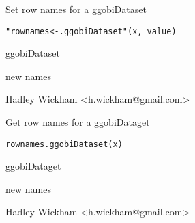 \documentclass{article}
\begin{document}
\begin{Description}\relax
Set row names for a ggobiDataset
\end{Description}
\begin{Usage}
\begin{verbatim}"rownames<-.ggobiDataset"(x, value)\end{verbatim}
\end{Usage}
\begin{Arguments}
\begin{ldescription}
\item[\code{x}] ggobiDataset
\item[\code{value}] new names
\end{ldescription}
\end{Arguments}
\begin{Details}\relax
\end{Details}
\begin{Author}\relax
Hadley Wickham <h.wickham@gmail.com>
\end{Author}
\begin{Examples}
\begin{ExampleCode}\end{ExampleCode}
\end{Examples}

\begin{Description}\relax
Get row names for a ggobiDataget
\end{Description}
\begin{Usage}
\begin{verbatim}rownames.ggobiDataset(x)\end{verbatim}
\end{Usage}
\begin{Arguments}
\begin{ldescription}
\item[\code{x}] ggobiDataget
\item[\code{}] 
\end{ldescription}
{new names}
\end{Arguments}
\begin{Details}\relax
\end{Details}
\begin{Author}\relax
Hadley Wickham <h.wickham@gmail.com>
\end{Author}
\begin{Examples}
\begin{ExampleCode}\end{ExampleCode}
\end{Examples}
\end{document}
